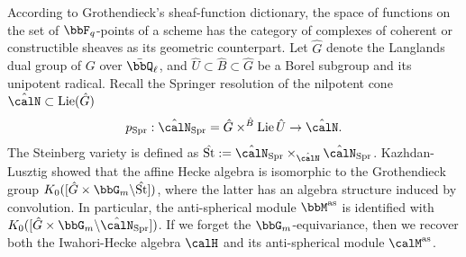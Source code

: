 \documentclass[10pt, reqno]{amsart}
\theoremstyle{plain}
\theoremstyle{definition}
\numberwithin{equation}{section}
\begin{document}
	According to Grothendieck's sheaf-function dictionary, the space of functions on the set of $\bbF_q$-points of a scheme has the category of complexes of coherent or constructible sheaves as its geometric counterpart. Let $\hat{G}$ denote the Langlands dual group of $G$ over $\bar{\bbQ}_\ell$, 
	and $\hat{U}\subset \hat{B}\subset \hat{G}$ be a Borel subgroup and its unipotent radical. Recall the Springer resolution of the nilpotent cone $\hat{\calN}\subset \mathrm{Lie}(\hat{G})$
	$$
	p_\mathrm{Spr}:\hat{\calN}_{\mathrm{Spr}}=\hat{G} \times^{\hat{B}} \mathrm{Lie}\,\hat{U}\rightarrow \hat{\calN}.
	$$
	The Steinberg variety is defined as $\hat{\mathrm{St}}:=\hat{\calN}_{\mathrm{Spr}}\times_{\hat{\calN}}\hat{\calN}_{\mathrm{Spr}}$.
	Kazhdan-Lusztig \cite{KL87} showed that the affine Hecke algebra is isomorphic to the Grothendieck group $ K_0([\hat{G}\times\bbG_m\backslash \hat{\mathrm{St}}])$, where the latter has an algebra structure induced by convolution.
	In particular, the anti-spherical module $\bbM^\mathrm{as}$ is identified with $K_0([\hat{G}\times\bbG_m\backslash\hat{\calN}_\mathrm{Spr}])$. If we forget the $\bbG_m$-equivariance, then we recover both the Iwahori-Hecke algebra $\calH$ and its anti-spherical module $\calM^{\mathrm{as}}$.
	
	
	
	
\end{document}
